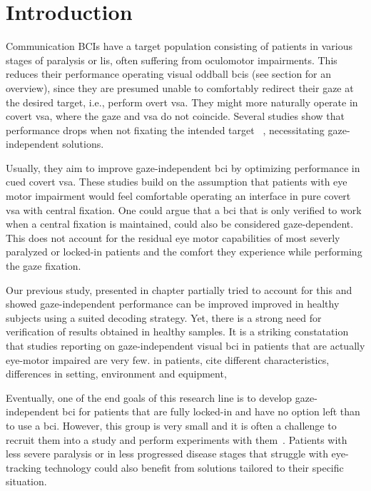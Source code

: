 \section{Introduction}

Communication BCIs have a target population consisting of patients in various
stages of paralysis or \ac{lis}, often suffering from oculomotor impairments.
This reduces their performance operating visual oddball \ac{bci}s (see
section for an overview), since they
are presumed unable to comfortably redirect their gaze at the desired target,
i.e., perform overt \ac{vsa}.
They might more naturally operate in covert \ac{vsa}, where the gaze and
\ac{vsa} do not coincide.
Several studies show that performance drops when not fixating the intended
target~\cite{Brunner2010, Frenzel2011,
Treder2010, RonAngevin2019, VanDenKerchove2024} , necessitating gaze-independent solutions.

Usually, they aim to improve gaze-independent \ac{bci} by optimizing
performance in cued covert \ac{vsa}.
These studies build on the assumption that patients with eye motor impairment
would feel comfortable operating an interface in pure covert \ac{vsa} with
central fixation.
One could argue that a \ac{bci} that is only verified to work when a central
fixation is maintained, could also be considered gaze-dependent.
This does not account for the residual eye motor capabilities of most severly
paralyzed or locked-in patients and the comfort they experience while
performing the gaze fixation.

Our previous study, presented in chapter   partially tried to account for this
and showed gaze-independent performance can be improved
improved in healthy subjects using a suited decoding strategy.
Yet, there is a strong need for verification of results obtained in healthy
samples.
It is a striking constatation that studies reporting on
gaze-independent visual \ac{bci} in patients that are actually eye-motor
impaired are very few.
in patients, cite different characteristics, differences
in setting, environment and equipment,

Eventually, one of the end goals of this research line is to develop
gaze-independent \ac{bci} for patients that
are fully locked-in and have no option left than to use a \ac{bci}.
However, this group is very small and it is often a challenge to recruit them
into a study and perform experiments with them~\cite{Wolpaw2006}.
Patients with less severe paralysis or in less progressed disease stages that struggle with
eye-tracking technology could also benefit from
solutions tailored to their specific situation.

